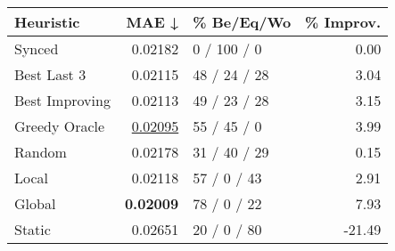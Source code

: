 \begin{tabular}{lrlr}
\toprule
\textbf{Heuristic} & \textbf{MAE ↓} & \textbf{\% Be/Eq/Wo} & \textbf{\% Improv.} \\
\midrule
            Synced &        0.02182 &          0 / 100 / 0 &                0.00 \\
\midrule
       Best Last 3 &        0.02115 &         48 / 24 / 28 &                3.04 \\
    Best Improving &        0.02113 &         49 / 23 / 28 &                3.15 \\
\addlinespace
     Greedy Oracle &        \underline{0.02095} &          55 / 45 / 0 &                3.99 \\
            Random &        0.02178 &         31 / 40 / 29 &                0.15 \\
\midrule
             Local &        0.02118 &          57 / 0 / 43 &                2.91 \\
            Global &        \textbf{0.02009} &          78 / 0 / 22 &                7.93 \\
\midrule
            Static &        0.02651 &          20 / 0 / 80 &              -21.49 \\
\bottomrule
\end{tabular}

\label{tab:iid_lr01_le1_bs2_Summary}
